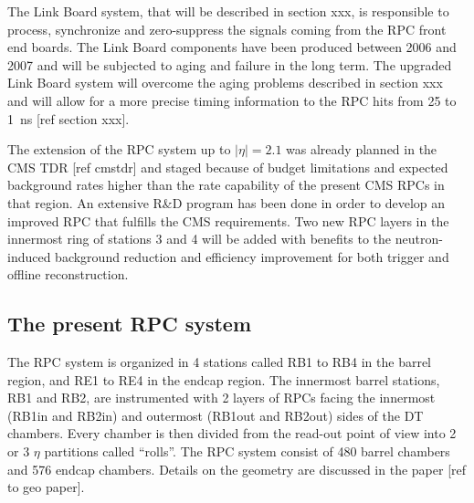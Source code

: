 	The Link Board system, that will be described in section xxx, is responsible to process, synchronize and zero-suppress the signals coming from the RPC front end boards. The Link Board components have been produced between 2006 and 2007 and will be subjected to aging and failure in the long term. The upgraded Link Board system will overcome the aging problems described in section xxx and will allow for a more precise timing information to the RPC hits from 25 to \SI{1}{ns} [ref section xxx].

	The extension of the RPC system up to $|\eta|=2.1$ was already planned in the CMS TDR [ref cmstdr] and staged because of budget limitations and expected background rates higher than the rate capability of the present CMS RPCs in that region. An extensive R\&D program has been done in order to develop an improved RPC that fulfills the CMS requirements. Two new RPC layers in the innermost ring of stations 3 and 4 will be added with benefits to the  neutron-induced background reduction and efficiency improvement for both trigger and offline reconstruction.

    \subsection{The present RPC system}
    
	The RPC system is organized in 4 stations called RB1 to RB4 in the barrel region, and RE1 to RE4 in the endcap region. The innermost barrel stations, RB1 and RB2, are instrumented with 2 layers of RPCs facing the innermost (RB1in and RB2in) and outermost (RB1out and RB2out) sides of the DT chambers. Every chamber is then divided from the read-out point of view into 2 or 3 $\eta$ partitions called ``rolls''. The RPC system consist of 480 barrel chambers and 576 endcap chambers. Details on the geometry are discussed in the paper [ref to geo paper].

